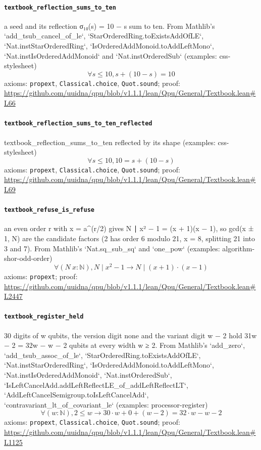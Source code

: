 \documentclass[11pt]{article}
\begin{document}
\paragraph{\texttt{textbook\_reflection\_sums\_to\_ten}}
a seed and its reflection σ₁₀(s) = 10 − s sum to ten. From Mathlib's `add\_tsub\_cancel\_of\_le`, `StarOrderedRing.toExistsAddOfLE`, `Nat.instStarOrderedRing`, `IsOrderedAddMonoid.toAddLeftMono`, `Nat.instIsOrderedAddMonoid` and `Nat.instOrderedSub` (examples: css-stylesheet)
\[ \forall s \le 10, s + (10 - s) = 10 \]
\noindent axioms: \texttt{propext}, \texttt{Classical.choice}, \texttt{Quot.sound}; proof: \url{https://github.com/uuidna/qpu/blob/v1.1.1/lean/Qpu/General/Textbook.lean\#L66}

\paragraph{\texttt{textbook\_reflection\_sums\_to\_ten\_reflected}}
textbook\_reflection\_sums\_to\_ten reflected by its shape (examples: css-stylesheet)
\[ \forall s \le 10, 10 = s + (10 - s) \]
\noindent axioms: \texttt{propext}, \texttt{Classical.choice}, \texttt{Quot.sound}; proof: \url{https://github.com/uuidna/qpu/blob/v1.1.1/lean/Qpu/General/Textbook.lean\#L69}

\paragraph{\texttt{textbook\_refuse\_is\_refuse}}
an even order r with x = a\^{}(r/2) gives N ∣ x² − 1 = (x + 1)(x − 1), so gcd(x ± 1, N) are the candidate factors (2 has order 6 modulo 21, x = 8, splitting 21 into 3 and 7). From Mathlib's `Nat.sq\_sub\_sq` and `one\_pow` (examples: algorithm-shor-odd-order)
\[ \forall (N\ x : \mathbb{N}), N \mid x ^{2} - 1 \to N \mid (x + 1) \cdot (x - 1) \]
\noindent axioms: \texttt{propext}; proof: \url{https://github.com/uuidna/qpu/blob/v1.1.1/lean/Qpu/General/Textbook.lean\#L2447}

\paragraph{\texttt{textbook\_register\_held}}
30 digits of w qubits, the version digit none and the variant digit w − 2 hold 31w − 2 = 32w − w − 2 qubits at every width w ≥ 2. From Mathlib's `add\_zero`, `add\_tsub\_assoc\_of\_le`, `StarOrderedRing.toExistsAddOfLE`, `Nat.instStarOrderedRing`, `IsOrderedAddMonoid.toAddLeftMono`, `Nat.instIsOrderedAddMonoid`, `Nat.instOrderedSub`, `IsLeftCancelAdd.addLeftReflectLE\_of\_addLeftReflectLT`, `AddLeftCancelSemigroup.toIsLeftCancelAdd`, `contravariant\_lt\_of\_covariant\_le` (examples: processor-register)
\[ \forall (w : \mathbb{N}), 2 \le w \to 30 \cdot w + 0 + (w - 2) = 32 \cdot w - w - 2 \]
\noindent axioms: \texttt{propext}, \texttt{Classical.choice}, \texttt{Quot.sound}; proof: \url{https://github.com/uuidna/qpu/blob/v1.1.1/lean/Qpu/General/Textbook.lean\#L1125}
\end{document}

